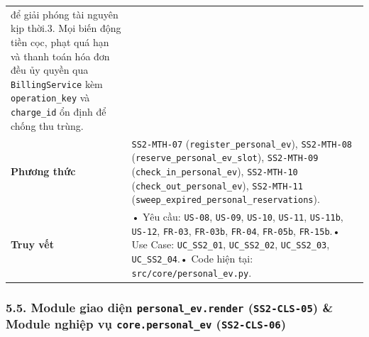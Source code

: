 \documentclass[11pt,a4paper]{article}
\begin{document}
\begin{longtable}[]{@{}
  >{\raggedright\arraybackslash}p{}
  >{\raggedright\arraybackslash}p{}@{}}
để giải phóng tài nguyên kịp thời.3. Mọi biến động tiền cọc, phạt quá
hạn và thanh toán hóa đơn đều ủy quyền qua \texttt{BillingService} kèm
\texttt{operation\_key} và \texttt{charge\_id} ổn định để chống thu
trùng. \\
\textbf{Phương thức} & \texttt{SS2-MTH-07}
(\texttt{register\_personal\_ev}), \texttt{SS2-MTH-08}
(\texttt{reserve\_personal\_ev\_slot}), \texttt{SS2-MTH-09}
(\texttt{check\_in\_personal\_ev}), \texttt{SS2-MTH-10}
(\texttt{check\_out\_personal\_ev}), \texttt{SS2-MTH-11}
(\texttt{sweep\_expired\_personal\_reservations}). \\
\textbf{Truy vết} & • Yêu cầu: \texttt{US-08}, \texttt{US-09},
\texttt{US-10}, \texttt{US-11}, \texttt{US-11b}, \texttt{US-12},
\texttt{FR-03}, \texttt{FR-03b}, \texttt{FR-04}, \texttt{FR-05b},
\texttt{FR-15b}.• Use Case: \texttt{UC\_SS2\_01}, \texttt{UC\_SS2\_02},
\texttt{UC\_SS2\_03}, \texttt{UC\_SS2\_04}.• Code hiện tại:
\texttt{src/core/personal\_ev.py}. \\
\end{longtable}

\hypertarget{module-giao-diux1ec7n-personal_ev.render-ss2-cls-05-module-nghiux1ec7p-vux1ee5-core.personal_ev-ss2-cls-06}{%
\subsubsection{\texorpdfstring{5.5. Module giao diện
\texttt{personal\_ev.render} (\texttt{SS2-CLS-05}) \& Module nghiệp vụ
\texttt{core.personal\_ev}
(\texttt{SS2-CLS-06})}{5.5. Module giao diện personal\_ev.render (SS2-CLS-05) \& Module nghiệp vụ core.personal\_ev (SS2-CLS-06)}}\label{module-giao-diux1ec7n-personal_ev.render-ss2-cls-05-module-nghiux1ec7p-vux1ee5-core.personal_ev-ss2-cls-06}}
\end{document}
